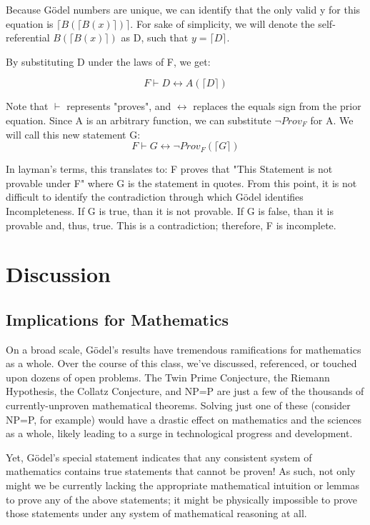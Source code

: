 \documentclass[conference]{IEEEtran}
\begin{document}
Because Gödel numbers are unique, we can identify that the only valid y for this equation is $\lceil B(\lceil B(x) \rceil) \rceil$. For sake of simplicity, we will denote the self-referential $B(\lceil B(x) \rceil)$ as D, such that $y = \lceil D \rceil$. 

By substituting D under the laws of F, we get:

\[F \vdash D \leftrightarrow A(\lceil D \rceil)\]

Note that $\vdash$ represents "proves", and $\leftrightarrow$ replaces the equals sign from the prior equation. Since A is an arbitrary function, we can substitute $\neg Prov_F$ for A. We will call this new statement G:
\[F \vdash G \leftrightarrow \neg Prov_F(\lceil G \rceil)\]

In layman's terms, this translates to: F proves that "This Statement is not provable under F" where G is the statement in quotes. From this point, it is not difficult to identify the contradiction through which Gödel identifies Incompleteness. If G is true, than it is not provable. If G is false, than it is provable and, thus, true. This is a contradiction; therefore, F is incomplete.

\section{Discussion}
\subsection{Implications for Mathematics}
On a broad scale, Gödel’s results have tremendous ramifications for mathematics as a whole. Over the course of this class, we’ve discussed, referenced, or touched upon dozens of open problems. The Twin Prime Conjecture, the Riemann Hypothesis, the Collatz Conjecture, and NP=P are just a few of the thousands of currently-unproven mathematical theorems. Solving just one of these (consider NP=P, for example) would have a drastic effect on mathematics and the sciences as a whole, likely leading to a surge in technological progress and development. 

Yet, Gödel’s special statement indicates that any consistent system of mathematics contains true statements that cannot be proven! As such, not only might we be currently lacking the appropriate mathematical intuition or lemmas to prove any of the above statements; it might be physically impossible to prove those statements under any system of mathematical reasoning at all.
\end{document}
